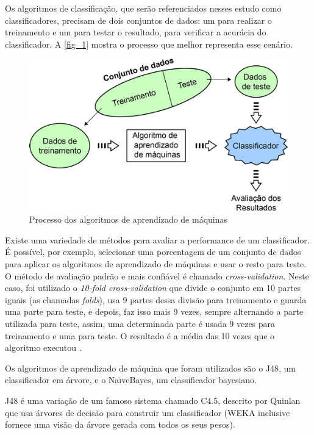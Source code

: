 Os algoritmos de classificação, que serão referenciados nesses estudo como classificadores, precisam de dois conjuntos de dados: um para realizar o treinamento e um para testar o resultado, para verificar a acurácia do classificador. A \autoref{fig_1} mostra o processo que melhor representa esse cenário.

\begin{figure}[h]
	\centering
	\includegraphics[scale=0.7]{figs/training-datasets-pequeno.png}
	\caption{\label{fig_1}Processo dos algoritmos de aprendizado de máquinas}
\end{figure}

Existe uma variedade de métodos para avaliar a performance de um classificador. É possível, por exemplo, selecionar uma porcentagem de um conjunto de dados para aplicar os algoritmos de aprendizado de máquinas e usar o resto para teste. O método de avaliação padrão e mais confiável é chamado \textit{cross-validation}. Neste caso, foi utilizado o \textit{10-fold cross-validation} que divide o conjunto em 10 partes iguais (as chamadas \textit{folds}), usa 9 partes dessa divisão para treinamento e guarda uma parte para teste, e depois, faz isso mais 9 vezes, sempre alternando a parte utilizada para teste, assim, uma determinada parte é usada 9 vezes para treinamento e uma para teste. O resultado é a média das 10 vezes que o algoritmo executou \cite{kohavi1995study}.

Os algoritmos de aprendizado de máquina que foram utilizados são o J48, um classificador em árvore, e o NaïveBayes, um classificador bayesiano.

J48 é uma variação de um famoso sistema chamado C4.5, descrito por Quinlan \cite{Quinlan1993} que usa árvores de decisão para construir um classificador (WEKA inclusive fornece uma visão da árvore gerada com todos os seus pesos).

